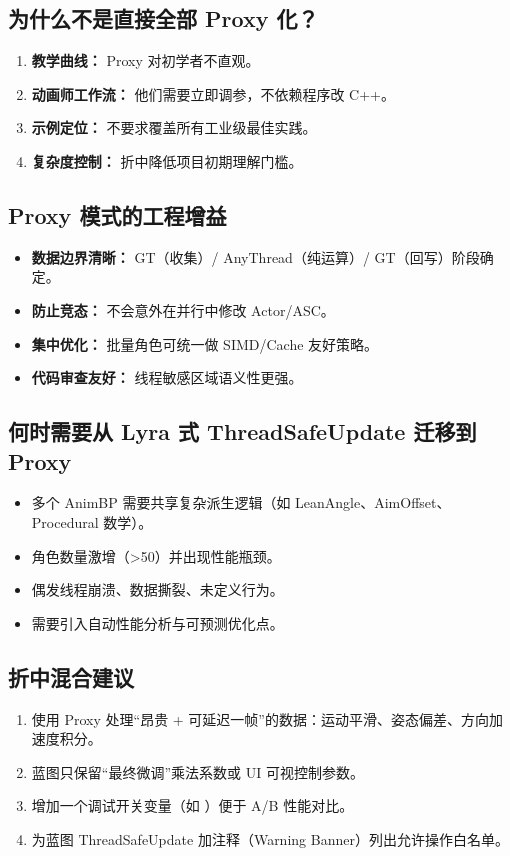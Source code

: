 \documentclass[10pt,openright,oneside,CJKmath]{MyBook}
\begin{document}
\subsection{为什么不是直接全部 Proxy 化？}
\begin{enumerate}[leftmargin=1.4em]
  \item \textbf{教学曲线：} Proxy 对初学者不直观。
  \item \textbf{动画师工作流：} 他们需要立即调参，不依赖程序改 C++。
  \item \textbf{示例定位：} 不要求覆盖所有工业级最佳实践。
  \item \textbf{复杂度控制：} 折中降低项目初期理解门槛。
\end{enumerate}

\subsection{Proxy 模式的工程增益}
\begin{itemize}
  \item \textbf{数据边界清晰：} GT（收集）/ AnyThread（纯运算）/ GT（回写）阶段确定。
  \item \textbf{防止竞态：} 不会意外在并行中修改 Actor/ASC。
  \item \textbf{集中优化：} 批量角色可统一做 SIMD/Cache 友好策略。
  \item \textbf{代码审查友好：} 线程敏感区域语义性更强。
\end{itemize}

\subsection{何时需要从 Lyra 式 ThreadSafeUpdate 迁移到 Proxy}
\begin{itemize}
  \item 多个 AnimBP 需要共享复杂派生逻辑（如 LeanAngle、AimOffset、Procedural 数学）。
  \item 角色数量激增（>50）并出现性能瓶颈。
  \item 偶发线程崩溃、数据撕裂、未定义行为。
  \item 需要引入自动性能分析与可预测优化点。
\end{itemize}

\subsection{折中混合建议}
\begin{enumerate}[leftmargin=1.4em]
  \item 使用 Proxy 处理“昂贵 + 可延迟一帧”的数据：运动平滑、姿态偏差、方向加速度积分。
  \item 蓝图只保留“最终微调”乘法系数或 UI 可视控制参数。
  \item 增加一个调试开关变量（如 ）便于 A/B 性能对比。
  \item 为蓝图 ThreadSafeUpdate 加注释（Warning Banner）列出允许操作白名单。
\end{enumerate}
\end{document}
